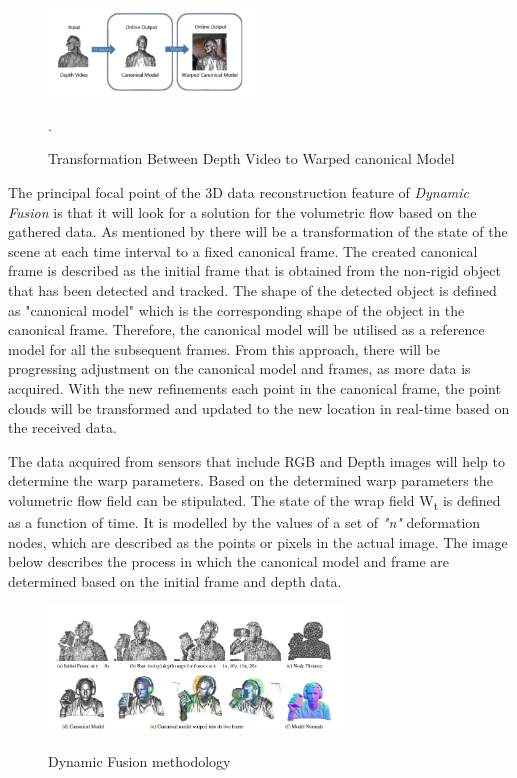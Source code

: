 \documentclass[12pt]{report}
\begin{document}
\vspace{5mm}

\begin{figure} %
    \centering
    \includegraphics[width=0.5\textwidth]{IMG_0073.png}
    \caption{Transformation Between Depth Video to Warped canonical Model} \cite[]{newcombe_fox_seitz_2015}.
\end{figure}
The principal focal point of the 3D data reconstruction feature of \textit{Dynamic Fusion}  is that it will look for a solution for the volumetric flow based on the gathered data.
As mentioned by  there will be a transformation of the state of the scene at each time interval to a fixed canonical frame.
The created canonical frame is described as the initial frame that is obtained from the non-rigid object that has been detected and tracked. The shape of the detected object is defined as "canonical model" which is the corresponding shape of the object in the canonical frame. 
Therefore, the canonical model will be utilised as a reference model for all the subsequent frames. From this approach, there will be progressing adjustment on the canonical model and frames, as more data is acquired.
With the new refinements each point in the canonical frame, the point clouds will be transformed and updated to the new location in real-time based on the received data.

The data acquired from sensors that include RGB and Depth images will help to determine the warp parameters. Based on the determined warp parameters the volumetric flow field can be stipulated.
The state of the wrap field W\textsubscript{t} is defined as a function of time. It is modelled by the values of a set of \textit{"n"} deformation nodes, which are described as the points or pixels in the actual image.
The image below describes the process in which the canonical model and frame are determined based on the initial frame and depth data. 
\begin{figure}{}%
    \centering
    \includegraphics[width=0.7\textwidth]{dynamicfusion2.png}
   \caption{Dynamic Fusion methodology}\cite[]{newcombe_fox_seitz_2015} 
\end{figure}
\end{document}
